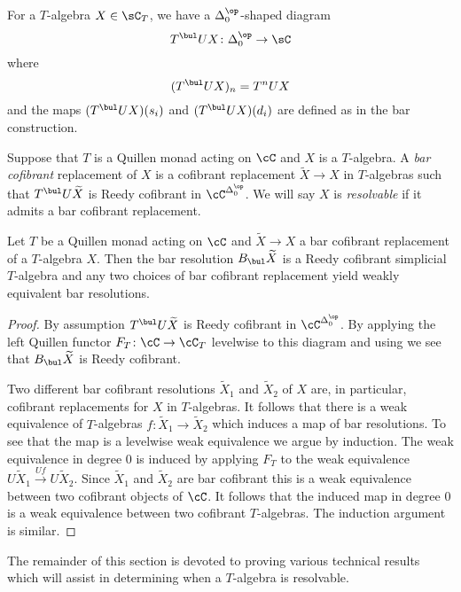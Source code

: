 \documentclass[leqno,oneside,english]{elsarticle}
\begin{document}
For a $T$-algebra $X \in \sC_T$, we have a $\Delta_0^{\op}$-shaped diagram
\[
T^\bul UX \colon \Delta_0^{\op} \to \sC
\]
where
\[
(T^\bul UX)_n = T^n UX
\]
and the maps $(T^\bul UX)(s_i)$ and $(T^\bul UX)(d_i)$ are defined as in the
bar construction.  

\begin{defn}\label{def:resolvable}   
  Suppose that $T$ is a Quillen monad acting on $\cC$ and $X$ is a
  $T$-algebra. A \emph{bar cofibrant} replacement of $X$ is a
  cofibrant replacement $\widetilde{X}\rightarrow X$ in $T$-algebras
  such that $T^{\bul}U\widetilde{X}$ is Reedy cofibrant in
  $\cC^{\Delta^{\op}_0}$. We will say $X$ is \emph{resolvable} if it
  admits a bar cofibrant replacement.
\end{defn}

\begin{prop}\label{prop:bar-construction-is-reedy-cofib}
  Let $T$ be a Quillen monad acting on $\cC$ and $\widetilde{X}\rightarrow X$ a bar cofibrant replacement of a $T$-algebra $X$. Then the bar resolution $B_\bul \widetilde{X}$ is a Reedy cofibrant simplicial $T$-algebra and any two choices of bar cofibrant replacement yield weakly equivalent bar resolutions. 
\end{prop}
\begin{proof}
  By assumption $T^{\bul}U\widetilde{X}$ is Reedy cofibrant in
  $\cC^{\Delta^{\op}_0}$. By applying the left
  Quillen functor $F_T\colon \cC\rightarrow \cC_T$ levelwise to this
  diagram and using  we see that $B_{\bul}\widetilde{X}$ is Reedy cofibrant.

  Two different bar cofibrant resolutions $\widetilde{X}_1$ and $\widetilde{X}_2$ of $X$ are, in particular, cofibrant replacements for $X$ in $T$-algebras. It follows that there is a weak equivalence of $T$-algebras $f\colon \widetilde{X}_1\rightarrow \widetilde{X}_2$ which induces a map of bar resolutions. To see that the map is a levelwise weak equivalence we argue by induction. The weak equivalence in degree 0 is induced by applying $F_T$ to the weak equivalence $U\widetilde{X}_1\xrightarrow{Uf} U\widetilde{X}_2$. Since $\widetilde{X}_1$ and $\widetilde{X}_2$ are bar cofibrant this is a weak equivalence between two cofibrant objects of $\cC$. It follows that the induced map in degree 0 is a weak equivalence between two cofibrant $T$-algebras. The induction argument is similar. 
  \end{proof}

The remainder of this section is devoted to proving various technical results
which will assist in determining when a $T$-algebra is resolvable.
\end{document}
